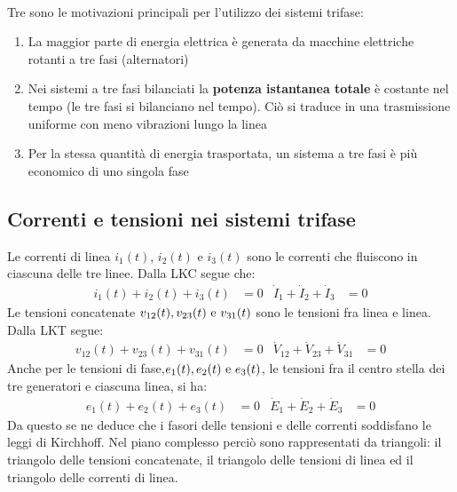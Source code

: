 \documentclass{article}
\begin{document}
\vspace*{0.2cm}\\
Tre sono le motivazioni principali per l'utilizzo dei sistemi trifase:
\begin{enumerate}
    \item La maggior parte di energia elettrica è generata da macchine elettriche rotanti a tre fasi (alternatori)
    \item Nei sistemi a tre fasi bilanciati la \textbf{potenza istantanea totale} è costante
    nel tempo (le tre fasi si bilanciano nel tempo). Ciò si traduce in una trasmissione uniforme con meno vibrazioni lungo la linea
    \item Per la stessa quantità di energia trasportata, un sistema a tre fasi è più
    economico di uno singola fase
\end{enumerate}



\subsection{Correnti e tensioni nei sistemi trifase}
Le correnti di linea $i_1(t)$, $i_2(t)$ e $i_3(t)$ sono le correnti che fluiscono in ciascuna delle tre linee. Dalla LKC segue che:
\begin{align*}
    i_1(t) + i_2(t)+i_3(t)&=0 & \dot I_1 + \dot I_2 + \dot I_3 &=0
\end{align*}
Le tensioni concatenate $v_{12}(t), v_{23}(t) \text{ e } v_{31}(t)$ sono le tensioni fra linea e linea. Dalla LKT segue:
\begin{align*}
    v_{12}(t) + v_{23}(t) + v_{31}(t) &= 0 & \dot V_{12} + \dot V_{23} + \dot V_{31} &= 0
\end{align*}
Anche per le tensioni di fase,$e_1 (t), e_2 (t) \text{ e } e_3(t)$, le tensioni fra il centro stella dei tre generatori e ciascuna linea, si ha:
\begin{align*}
    e_1 (t) + e_2 (t) + e_3(t) &= 0 & \dot E_1 + \dot E_2 + \dot E_3 &= 0
\end{align*}
Da questo se ne deduce che i fasori delle tensioni e delle correnti soddisfano le leggi di Kirchhoff. Nel piano complesso perciò sono rappresentati da
triangoli: il triangolo delle tensioni concatenate, il triangolo delle tensioni di linea ed il triangolo
delle correnti di linea. 
\end{document}
